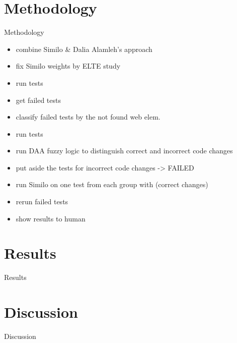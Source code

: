 \documentclass{beamer}
\begin{document}
\section{Methodology}
\begin{frame}{Methodology}
\begin{itemize}
    \item combine Similo \& Dalia Alamleh's approach
    \item fix Similo weights by ELTE study
    \item run tests
    \item get failed tests
    \item classify failed tests by the not found web elem.
    \item run tests
    \item run DAA fuzzy logic to distinguish correct and incorrect code changes 
    \item put aside the tests for incorrect code changes -> FAILED
    \item run Similo on one test from each group with (correct changes)
    \item rerun failed tests
    \item show results to human
\end{itemize}
\end{frame}

\section{Results}
\begin{frame}{Results}
\end{frame}

\section{Discussion}
\begin{frame}{Discussion}
\end{frame}
\end{document}
